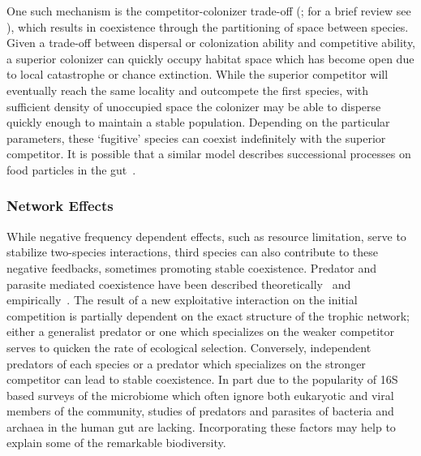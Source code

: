 \documentclass[12pt]{article}
\begin{document}
One such mechanism is the competitor-colonizer trade-off
(\citealp{Levins1971}; for a brief review see \citealp{Yu2001}),
which results in coexistence through the partitioning of space between species.
Given a trade-off between dispersal or colonization ability
and competitive ability,
a superior colonizer can quickly occupy habitat space which has become open
due to local catastrophe or chance extinction.
While the superior competitor will eventually reach the same locality
and outcompete the first species,
with sufficient density of unoccupied space
the colonizer may be able to disperse quickly enough to maintain a stable
population.
Depending on the particular parameters,
these `fugitive' species can coexist indefinitely with the superior competitor.
It is possible that a similar model describes successional processes
on food particles in the gut~\citep{Macfarlane2006}.

\subsubsection{Network Effects}
While negative frequency dependent effects,
such as resource limitation,
serve to stabilize two-species interactions,
third species can also contribute to these negative feedbacks,
sometimes promoting stable coexistence.
Predator and parasite mediated coexistence have been described
theoretically~\citep{Caswell1978}
and empirically~\citep{Paine1966}.
The result of a new exploitative interaction on the initial
competition is partially dependent on the exact structure of the
trophic network;
either a generalist predator or one which specializes on the weaker
competitor serves to quicken the rate of ecological selection.
Conversely, independent predators of each species or a predator
which specializes on the stronger competitor can lead to stable
coexistence.
In part due to the popularity of 16S based surveys of the
microbiome
which often ignore both eukaryotic
and viral members of the community,
studies of predators and parasites of bacteria and archaea
in the human gut are lacking.
Incorporating these factors may help to explain some of the
remarkable biodiversity.
\end{document}
